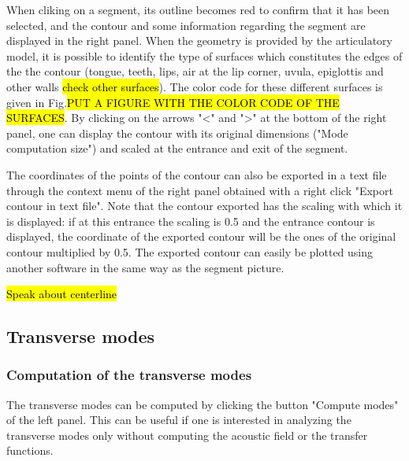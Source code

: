 \documentclass[]{article}
\begin{document}
	When cliking on a segment, its outline becomes red to confirm that
	it has been selected, and the contour and some information 
	regarding the segment are displayed in the right panel.
	When the geometry is provided by the articulatory model, it is 
	possible to identify the type of surfaces which constitutes the 
	edges of the the contour (tongue, teeth, lips, air at the lip corner, uvula, epiglottis and other walls \hl{check other surfaces}).
	The color code for these different surfaces is given in 
	Fig.\hl{PUT A FIGURE WITH THE COLOR CODE OF THE SURFACES}.
	By clicking on the arrows "<" and ">" at the bottom of the right  
	panel, one can display the contour with its original dimensions 
	("Mode computation size") and scaled at the entrance and exit of the
	segment.
	
	The coordinates of the points of the contour can also be exported 
	in a text file through the context menu of the right panel obtained
	with a right click "Export contour in text file". 
	Note that the contour exported has the scaling with which it is 
	displayed: if at this entrance the scaling is 0.5 and the entrance 
	contour is displayed, the coordinate of the exported contour will
	be the ones of the original contour multiplied by 0.5.
	The exported contour can easily be plotted using another software in 
	the same way as the segment picture.
	
	\hl{Speak about centerline}
	
	\subsection{Transverse modes}
	
	\subsubsection{Computation of the transverse modes}
	
	The transverse modes can be computed by clicking the button
	"Compute modes" of the left panel. This can be useful if one is interested in analyzing the transverse modes only without 
	computing the acoustic field or the transfer functions.
	
\end{document}
